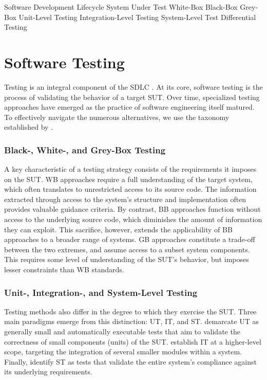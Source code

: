  {Software Development Lifecycle}
 {System Under Test}
 {White-Box}
 {Black-Box}
 {Grey-Box}
 {Unit-Level Testing}
 {Integration-Level Testing}
 {System-Level Test}
 {Differential Testing}

\section{Software Testing}

Testing is an integral component of the \gls{SDLC} \cite{jamil2016software}.
At its core, software testing is the process of validating
the behavior of a target \gls{SUT}. 
Over time, specialized testing approaches have emerged as
the practice of software engineering itself matured.
To effectively navigate the numerous alternatives, we use the
taxonomy established by \citet{umar2020comprehensive}.

\subsubsection{Black-, White-, and Grey-Box Testing}

A key characteristic of a testing strategy consists of 
the requirements it imposes on the \gls{SUT}. 
\Gls{WB} approaches require a full understanding of the target
system, which often translates to unrestricted access to its source code.
The information extracted through access to the system's structure
and implementation often provides valuable guidance criteria.
By contrast, \Gls{BB} approaches function without access to the underlying
source code, which diminishes the amount of information they can exploit.
This sacrifice, however, extends the applicability of \gls{BB} approaches 
to a broader range of systems.
\Gls{GB} approaches constitute a trade-off between the two 
extremes, and assume access to a subset system components.
This requires some level of understanding of the \gls{SUT}'s
behavior, but imposes lesser constraints than \gls{WB} standards.

\subsubsection{Unit-, Integration-, and System-Level Testing}

Testing methods also differ in the degree to which they exercise the \gls{SUT}.
Three main paradigms emerge from this distinction: 
\Gls{UT}, \Gls{IT}, and \gls{ST}.
\citet{daka2014survey} demarcate \gls{UT} as 
generally small and automatically executable tests that aim
to validate the correctness of small components (units) of the \gls{SUT}.
\citet{leung1990study} establish \gls{IT} at a higher-level scope, targeting
the integration of several smaller modules within a system.
Finally, \citet{umar2020comprehensive} identify \gls{ST} as tests
that validate the entire system's compliance against its underlying
requirements.

